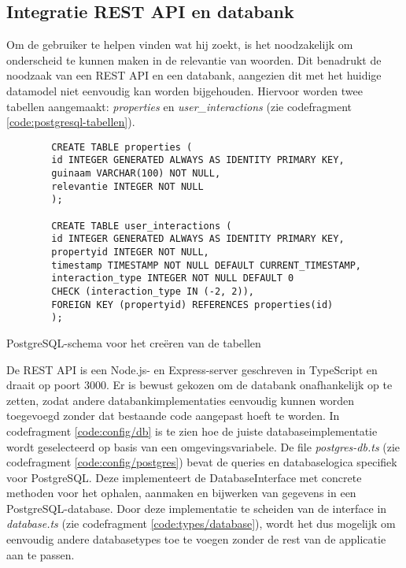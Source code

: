 \subsection{Integratie REST API en databank}
Om de gebruiker te helpen vinden wat hij zoekt, is het noodzakelijk om onderscheid te kunnen maken in de relevantie van woorden. Dit benadrukt de noodzaak van een REST API en een databank, aangezien dit met het huidige datamodel niet eenvoudig kan worden bijgehouden. Hiervoor worden twee tabellen aangemaakt: \textit{properties} en \textit{user\_interactions} (zie codefragment \ref{code:postgresql-tabellen}).
\begin{listing}
    \begin{verbatim}
        CREATE TABLE properties ( 
        id INTEGER GENERATED ALWAYS AS IDENTITY PRIMARY KEY, 
        guinaam VARCHAR(100) NOT NULL, 
        relevantie INTEGER NOT NULL 
        );
        
        CREATE TABLE user_interactions (
        id INTEGER GENERATED ALWAYS AS IDENTITY PRIMARY KEY,
        propertyid INTEGER NOT NULL,
        timestamp TIMESTAMP NOT NULL DEFAULT CURRENT_TIMESTAMP,
        interaction_type INTEGER NOT NULL DEFAULT 0 
        CHECK (interaction_type IN (-2, 2)),
        FOREIGN KEY (propertyid) REFERENCES properties(id)
        );
    \end{verbatim}
    \caption{PostgreSQL-schema voor het creëren van de tabellen}
    \label{code:postgresql-tabellen}
\end{listing}
De REST API is een Node.js- en Express-server geschreven in TypeScript en draait op poort 3000. Er is bewust gekozen om de databank onafhankelijk op te zetten, zodat andere databankimplementaties eenvoudig kunnen worden toegevoegd zonder dat bestaande code aangepast hoeft te worden. In codefragment \ref{code:config/db} is te zien hoe de juiste databaseimplementatie wordt geselecteerd op basis van een omgevingsvariabele. De file \textit{postgres-db.ts} (zie codefragment \ref{code:config/postgres}) bevat de queries en databaselogica specifiek voor PostgreSQL. Deze implementeert de DatabaseInterface met concrete methoden voor het ophalen, aanmaken en bijwerken van gegevens in een PostgreSQL-database. Door deze implementatie te scheiden van de interface in \textit{database.ts} (zie codefragment \ref{code:types/database}), wordt het dus mogelijk om eenvoudig andere databasetypes toe te voegen zonder de rest van de applicatie aan te passen.
